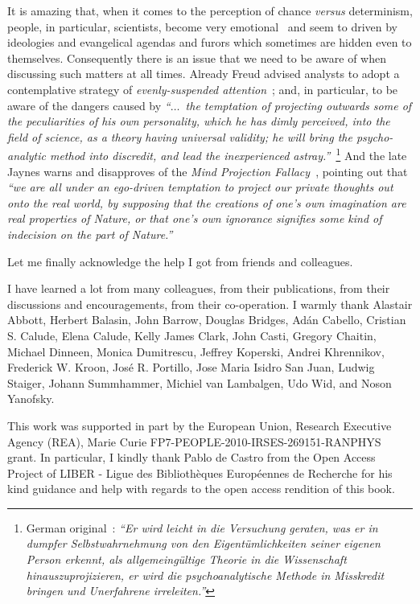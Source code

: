 It is amazing that, when it comes to the perception of chance {\it versus} determinism, people, in particular, scientists,
become very emotional~\cite{2002-cross} and seem to driven by ideologies and evangelical agendas
and furors which sometimes are hidden even to themselves.
Consequently there is an issue that we need to be aware of when discussing such matters at all times.
Already Freud advised analysts
to adopt a contemplative strategy of {\em evenly-suspended attention}~\cite{Freud-1912,Freud-1912-e};
and, in particular,  to be aware of the dangers
caused by {\em
``$\ldots$~the temptation of projecting outwards
some of the peculiarities of his own personality,
which he has dimly perceived, into the field of science,
as a theory having universal validity; he will bring the psycho-analytic method into discredit, and lead the inexperienced astray.''}~\cite{Freud-1912-e}\footnote{
German original~\cite{Freud-1912}: {\em ``Er wird leicht in die Versuchung geraten,
was er in dumpfer Selbstwahrnehmung von den Eigent\"umlichkeiten seiner eigenen Person erkennt,
als allgemeing\"ultige Theorie in die Wissenschaft hinauszuprojizieren,
er wird die psychoanalytische Methode in Misskredit bringen und Unerfahrene irreleiten.''}}
And the late Jaynes warns and disapproves of
the {\em Mind Projection Fallacy}~\cite{jaynes-89,jaynes-90,Powers596},
pointing out that
{\em ``we are all under an ego-driven temptation to project our private
thoughts out onto the real world, by supposing that the creations of one's own imagination are real
properties of Nature, or that one's own ignorance signifies some kind of indecision on the part of
Nature.''}

Let me finally acknowledge the help I got from friends and colleagues.

I have learned a lot from many colleagues, from their publications, from
their discussions and encouragements, from their co-operation. I warmly thank
Alastair Abbott,
Herbert Balasin, John Barrow, Douglas Bridges,
Ad\'an Cabello,  Cristian S. Calude,  Elena Calude, Kelly James Clark, John
Casti, Gregory Chaitin, Michael Dinneen,
Monica Dumitrescu, Jeffrey Koperski,
Andrei Khrennikov,
Frederick W. Kroon,
Jos\'{e} R. Portillo,
Jose Maria Isidro San Juan,
Ludwig Staiger,
Johann Summhammer,
Michiel van Lambalgen,
Udo Wid,
and  Noson Yanofsky.


This work was supported in part by the European Union, Research Executive Agency (REA),
Marie Curie FP7-PEOPLE-2010-IRSES-269151-RANPHYS grant.
In particular, I kindly thank  Pablo de Castro from the
Open Access Project of
LIBER - Ligue des Biblioth\`eques Europ\'eennes de Recherche
for his kind guidance and help with regards to the open access rendition of this book.

